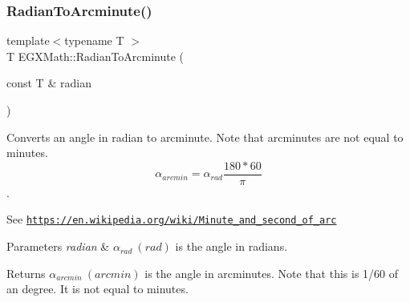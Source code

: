 \subsubsection{\texorpdfstring{Radian\+To\+Arcminute()}{RadianToArcminute()}}
{\footnotesize\ttfamily template$<$typename T $>$ \\
T E\+G\+X\+Math\+::\+Radian\+To\+Arcminute (\begin{DoxyParamCaption}\item[{const T \&}]{radian }\end{DoxyParamCaption})}



Converts an angle in radian to arcminute. Note that arcminutes are not equal to minutes. \[\alpha_{arcmin}=\alpha_{rad}\frac{180 * 60}{\pi}\]. 

See \href{https://en.wikipedia.org/wiki/Minute_and_second_of_arc}{\tt https\+://en.\+wikipedia.\+org/wiki/\+Minute\+\_\+and\+\_\+second\+\_\+of\+\_\+arc} 
\begin{DoxyParams}{Parameters}
{\em radian} & $\alpha_{rad}\ (rad)$ is the angle in radians. \\
\hline
\end{DoxyParams}
\begin{DoxyReturn}{Returns}
$\alpha_{arcmin}\ (arcmin)$ is the angle in arcminutes. Note that this is 1/60 of an degree. It is not equal to minutes. 
\end{DoxyReturn}

